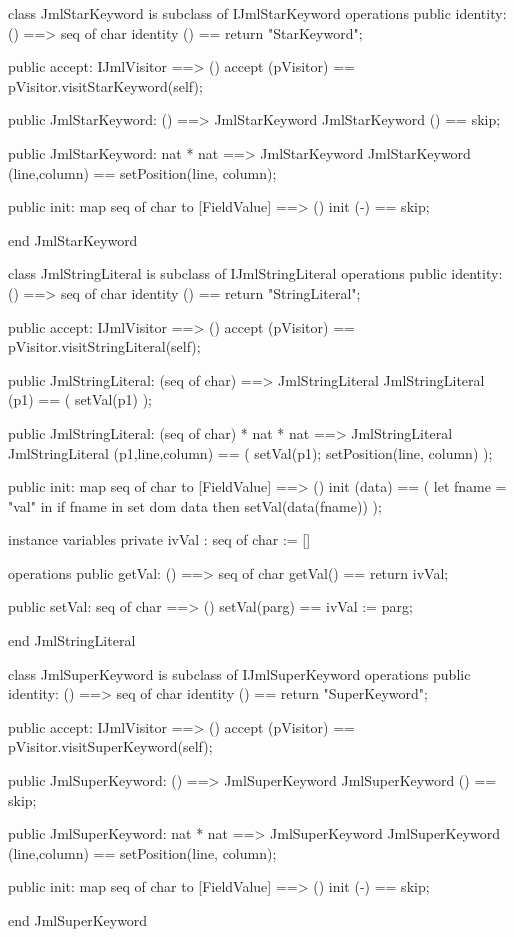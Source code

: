 \begin{vdm_al}
class JmlStarKeyword is subclass of IJmlStarKeyword
operations
  public identity: () ==> seq of char
  identity () == return "StarKeyword";

  public accept: IJmlVisitor ==> ()
  accept (pVisitor) == pVisitor.visitStarKeyword(self);

  public JmlStarKeyword:
    () ==> JmlStarKeyword
  JmlStarKeyword () == 
    skip;

  public JmlStarKeyword:
    nat *
    nat ==> JmlStarKeyword
  JmlStarKeyword (line,column) == 
    setPosition(line, column);

  public init: map seq of char to [FieldValue] ==> ()
  init (-) == skip;

end JmlStarKeyword
\end{vdm_al}

\begin{vdm_al}
class JmlStringLiteral is subclass of IJmlStringLiteral
operations
  public identity: () ==> seq of char
  identity () == return "StringLiteral";

  public accept: IJmlVisitor ==> ()
  accept (pVisitor) == pVisitor.visitStringLiteral(self);

  public JmlStringLiteral:
    (seq of char) ==> JmlStringLiteral
  JmlStringLiteral (p1) == 
    ( setVal(p1) );

  public JmlStringLiteral:
    (seq of char) *
    nat *
    nat ==> JmlStringLiteral
  JmlStringLiteral (p1,line,column) == 
    ( setVal(p1);
      setPosition(line, column) );

  public init: map seq of char to [FieldValue] ==> ()
  init (data) ==
    ( let fname = "val" in
        if fname in set dom data
        then setVal(data(fname)) );

instance variables
  private ivVal : seq of char := []

operations
  public getVal: () ==> seq of char
  getVal() == return ivVal;

  public setVal: seq of char ==> ()
  setVal(parg) == ivVal := parg;

end JmlStringLiteral
\end{vdm_al}

\begin{vdm_al}
class JmlSuperKeyword is subclass of IJmlSuperKeyword
operations
  public identity: () ==> seq of char
  identity () == return "SuperKeyword";

  public accept: IJmlVisitor ==> ()
  accept (pVisitor) == pVisitor.visitSuperKeyword(self);

  public JmlSuperKeyword:
    () ==> JmlSuperKeyword
  JmlSuperKeyword () == 
    skip;

  public JmlSuperKeyword:
    nat *
    nat ==> JmlSuperKeyword
  JmlSuperKeyword (line,column) == 
    setPosition(line, column);

  public init: map seq of char to [FieldValue] ==> ()
  init (-) == skip;

end JmlSuperKeyword
\end{vdm_al}

